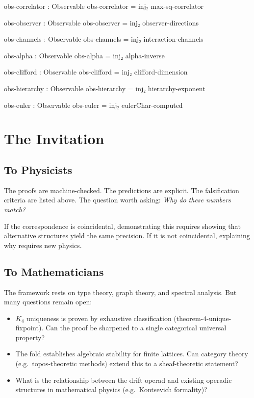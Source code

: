 \documentclass[11pt,a4paper]{book}
\def\texttt#1{#1}%
\begin{document}
\begin{code}
  obs-correlator : Observable
  obs-correlator = inj₂ max-sq-correlator

  obs-observer   : Observable
  obs-observer   = inj₂ observer-directions

  obs-channels   : Observable
  obs-channels   = inj₂ interaction-channels

  obs-alpha      : Observable
  obs-alpha      = inj₂ alpha-inverse

  obs-clifford   : Observable
  obs-clifford   = inj₂ clifford-dimension

  obs-hierarchy  : Observable
  obs-hierarchy  = inj₂ hierarchy-exponent

  obs-euler      : Observable
  obs-euler      = inj₂ eulerChar-computed
\end{code}

\chapter{The Invitation}

\section{To Physicists}

The proofs are machine-checked. The predictions are explicit. The
falsification criteria are listed above. The question worth asking:
\emph{Why do these numbers match?}

If the correspondence is coincidental, demonstrating this requires
showing that alternative structures yield the same precision.  If it
is not coincidental, explaining why requires new physics.

\section{To Mathematicians}

The framework rests on type theory, graph theory, and spectral analysis. But many questions remain open:

\begin{itemize}
\item $K_4$ uniqueness is proven by exhaustive classification
  (\texttt{theorem-4-unique-fixpoint}).  Can the proof be sharpened to a
  single categorical universal property?
\item The fold establishes algebraic stability for finite lattices.  Can
  category theory (e.g.\ topos-theoretic methods) extend this to a
  sheaf-theoretic statement?
\item What is the relationship between the drift operad and existing
  operadic structures in mathematical physics (e.g.\ Kontsevich formality)?
\end{itemize}
\end{document}
